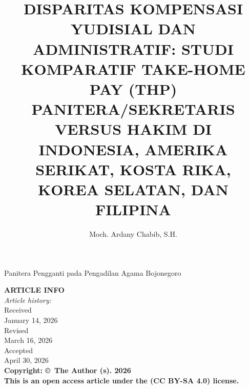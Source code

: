 \documentclass[12pt, a4paper]{article}
\title{\textbf{DISPARITAS KOMPENSASI YUDISIAL DAN ADMINISTRATIF: STUDI KOMPARATIF TAKE-HOME PAY (THP) PANITERA/SEKRETARIS VERSUS HAKIM DI INDONESIA, AMERIKA SERIKAT, KOSTA RIKA, KOREA SELATAN, DAN FILIPINA}}
\author{Moch. Ardany Chabib, S.H.}
\date{}
\begin{document}
\maketitle
\begin{center}
    Panitera Pengganti pada Pengadilan Agama Bojonegoro
\end{center}

\vspace{1em}

\noindent
\begin{minipage}[t]{0.22\textwidth}
    \vspace{0pt}
    \fontsize{9}{11}\selectfont\raggedright
    \textbf{ARTICLE INFO}\\
    \textit{Article history:}\\
    Received\\
    January 14, 2026\\
    Revised\\
    March 16, 2026\\
    Accepted\\
    April 30, 2026\\
    \vspace{1em}
    \textbf{Copyright: \copyright~The Author (s). 2026}\\
    \textbf{This is an open access article under the (CC BY-SA 4.0) license.}\\
\end{minipage}%
\hfill\vrule\hfill%
\end{document}
